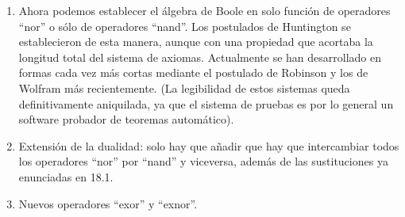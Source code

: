 \begin{enumerate}
\begin{enumerate}
\begin{enumerate}
      \begin{enumerate}
      \def\labelenumiv{\arabic{enumiv}.}
      \item
        ``NOR'':

        \begin{enumerate}
        \def\labelenumv{\arabic{enumv}.}
        \tightlist
        \item
          \[{{x + y} = {({x@y})}}@{({x@y})}\]
        \item
          \[{x \cdot y} = {({{({x@x})}@{({y@y})}})}\]
        \item
          \[\overline{x} = {x@x}\]
        \end{enumerate}
      \item
        ``NAND'':

        \begin{enumerate}
        \def\labelenumv{\arabic{enumv}.}
        \tightlist
        \item
          \[{{x \cdot y} = {({x@y})}}@{({x@y})}\]
        \item
          \[{{x + y} = {({x@x})}}@{({y@y})}\]
        \item
          \[\overline{x} = {x@x}\]
        \end{enumerate}
      \end{enumerate}
    \item
      Ahora podemos establecer el álgebra de Boole en solo función de
      operadores ``nor'' o sólo de operadores ``nand''. Los postulados
      de Huntington se establecieron de esta manera, aunque con una
      propiedad que acortaba la longitud total del sistema de axiomas.
      Actualmente se han desarrollado en formas cada vez más cortas
      mediante el postulado de Robinson y los de Wolfram más
      recientemente. (La legibilidad de estos sistemas queda
      definitivamente aniquilada, ya que el sistema de pruebas es por lo
      general un software probador de teoremas automático).
    \item
      Extensión de la dualidad: solo hay que añadir que hay que
      intercambiar todos los operadores ``nor'' por ``nand'' y
      viceversa, además de las sustituciones ya enunciadas en 18.1.
    \item
      Nuevos operadores ``exor'' y ``exnor''.


\end{enumerate}
\end{enumerate}
\end{enumerate}

